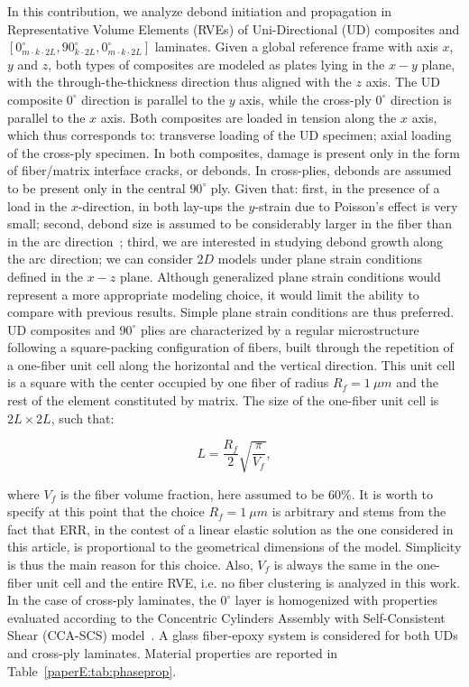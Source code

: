 In this contribution, we analyze debond initiation and propagation in Representative Volume Elements (RVEs) of Uni-Directional (UD) composites and $\left[0_{m\cdot k\cdot2L}^{\circ},90_{k\cdot2L}^{\circ},0_{m\cdot k\cdot2L}^{\circ}\right]$ laminates. Given a global reference frame with axis $x$, $y$ and $z$, both types of composites are modeled as plates lying in the $x-y$ plane, with the through-the-thickness direction thus aligned with the $z$ axis. The UD composite $0^{\circ}$ direction is parallel to the $y$ axis, while the cross-ply $0^{\circ}$ direction is parallel to the $x$ axis. Both composites are loaded in tension along the $x$ axis, which thus corresponds to: transverse loading of the UD specimen; axial loading of the cross-ply specimen. In both composites, damage is present only in the form of fiber/matrix interface cracks, or debonds. In cross-plies, debonds are assumed to be present only in the central ${90^{\circ}}$ ply. Given that: first, in the presence of a load in the $x$-direction, in both lay-ups the $y$-strain due to Poisson's effect is very small; second, debond size is assumed to be considerably larger in the fiber than in the arc direction~\cite{Zhang1997}; third, we are interested in studying debond growth along the arc direction; we can consider $2D$ models under plane strain conditions defined in the $x-z$ plane. Although generalized plane strain conditions would represent a more appropriate modeling choice, it would limit the ability to compare with previous results. Simple plane strain conditions are thus preferred. UD composites and $90^{\circ}$ plies are characterized by a regular microstructure following a square-packing configuration of fibers, built through the repetition of a one-fiber unit cell along the horizontal and the vertical direction. This unit cell is a square with the center occupied by one fiber of radius $R_{f}=1\ \mu m$ and the rest of the element constituted by matrix. The size of the one-fiber unit cell is $2L\times 2L$, such that:

\begin{equation}\label{paperE:eq:LVf}
L=\frac{R_{f}}{2}\sqrt{\frac{\pi}{V_{f}}},
\end{equation}

where $V_{f}$ is the fiber volume fraction, here assumed to be $60\%$. It is worth to specify at this point that the choice $R_{f}=1\ \mu m$ is arbitrary and stems from the fact that ERR, in the contest of a linear elastic solution as the one considered in this article, is proportional to the geometrical dimensions of the model. Simplicity is thus the main reason for this choice. Also, $V_{f}$ is always the same in the one-fiber unit cell and the entire RVE, i.e. no fiber clustering is analyzed in this work. In the case of cross-ply laminates, the $0^{\circ}$ layer is homogenized with properties evaluated according to the Concentric Cylinders Assembly with Self-Consistent Shear (CCA-SCS) model~\cite{Hashin1983,Christensen1979}. A glass fiber-epoxy system is considered for both UDs and cross-ply laminates. Material properties are reported in Table~\ref{paperE:tab:phaseprop}.

